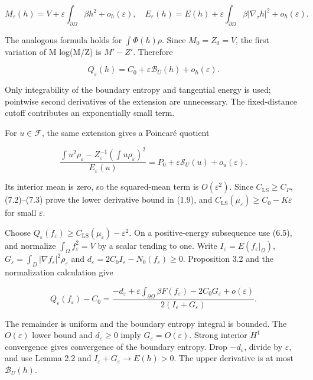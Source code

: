 \documentclass[11pt]{article}
\begin{document}
\[M_\varepsilon(h)=V+\varepsilon\int_{\partial\Omega}\beta h^2+o_h(\varepsilon),
\quad E_\varepsilon(h)=E(h)+\varepsilon\int_{\partial\Omega}\beta|\nabla_\tau h|^2+o_h(\varepsilon).\tag{7.1}\]

The analogous formula holds for \(\int \Phi (h)\rho\). Since
\(M_0=Z_0=V\), the first variation of M log(M/Z) is \(M'-Z'\). Therefore

\[Q_\varepsilon(h)=C_0+\varepsilon\mathcal B_U(h)+o_h(\varepsilon).\tag{7.2}\]

Only integrability of the boundary entropy and tangential energy is
used; pointwise second derivatives of the extension are unnecessary. The
fixed-distance cutoff contributes an exponentially small term.

For \(u\in \mathcal{F}\), the same extension gives a Poincaré quotient

\[\frac{\int u^2\rho_\varepsilon-Z_\varepsilon^{-1}(\int u\rho_\varepsilon)^2}
{E_\varepsilon(u)}
=P_0+\varepsilon\mathcal S_U(u)+o_u(\varepsilon).\tag{7.3}\]

Its interior mean is zero, so the squared-mean term is
\(O(\varepsilon ^{2})\). Since \(C_{\mathrm{LS}}\geq C_P\), (7.2)--(7.3)
prove the lower derivative bound in (1.9), and
\(C_{\mathrm{LS}}(\mu _\varepsilon )\geq C_0-K\varepsilon\) for small
\(\varepsilon\).

Choose
\(Q_\varepsilon (f_\varepsilon )\geq C_{\mathrm{LS}}(\mu _\varepsilon )-\varepsilon ^{2}\).
On a positive-energy subsequence use (6.5), and normalize
\(\int _\Omega f_\varepsilon ^{2}=V\) by a scalar tending to one. Write
\(I_\varepsilon =E(f_\varepsilon |_\Omega )\),
\(G_\varepsilon =\int _D|\nabla f_\varepsilon |^{2}\rho _\varepsilon\)
and \(d_\varepsilon =2C_0I_\varepsilon -N_0(f_\varepsilon )\geq 0\).
Proposition 3.2 and the normalization calculation give

\[Q_\varepsilon(f_\varepsilon)-C_0
=\frac{-d_\varepsilon+\varepsilon\int_{\partial\Omega}\beta F(f_\varepsilon)
-2C_0G_\varepsilon+o(\varepsilon)}{2(I_\varepsilon+G_\varepsilon)}.\tag{7.4}\]

The remainder is uniform and the boundary entropy integral is bounded.
The \(O(\varepsilon )\) lower bound and \(d_\varepsilon \geq 0\) imply
\(G_\varepsilon =O(\varepsilon )\). Strong interior \(H^{1}\)
convergence gives convergence of the boundary entropy. Drop
\(-d_\varepsilon\), divide by \(\varepsilon\), and use Lemma 2.2 and
\(I_\varepsilon +G_\varepsilon \to E(h)>0\). The upper derivative is at
most \(\mathcal{B} _U(h)\).
\end{document}
